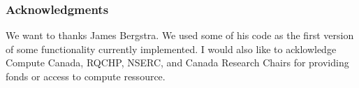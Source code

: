 \documentclass{article} %
\begin{document}
\subsubsection*{Acknowledgments}

We want to thanks James Bergstra. We used some of his code as the first version of some functionality currently implemented. I would also like to acklowledge Compute Canada, RQCHP, NSERC, and Canada Research Chairs for providing fonds or access to compute ressource.




\end{document}

